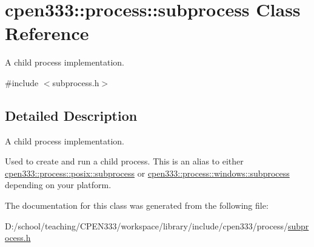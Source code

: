 \hypertarget{classcpen333_1_1process_1_1subprocess}{}\section{cpen333\+:\+:process\+:\+:subprocess Class Reference}
\label{classcpen333_1_1process_1_1subprocess}


A child process implementation.  




{\ttfamily \#include $<$subprocess.\+h$>$}



\subsection{Detailed Description}
A child process implementation. 

Used to create and run a child process. This is an alias to either \hyperlink{classcpen333_1_1process_1_1posix_1_1subprocess}{cpen333\+::process\+::posix\+::subprocess} or \hyperlink{classcpen333_1_1process_1_1windows_1_1subprocess}{cpen333\+::process\+::windows\+::subprocess} depending on your platform. 

The documentation for this class was generated from the following file\+:\begin{DoxyCompactItemize}
\item 
D\+:/school/teaching/\+C\+P\+E\+N333/workspace/library/include/cpen333/process/\hyperlink{subprocess_8h}{subprocess.\+h}\end{DoxyCompactItemize}

